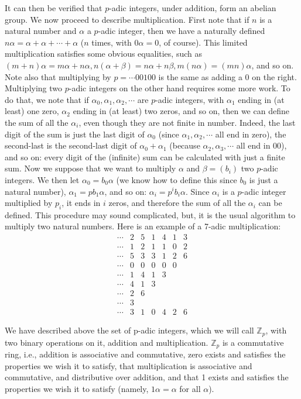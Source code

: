 \documentclass{llncs}
\begin{document}
It can then be verified that $p$-adic integers, under addition, form an abelian
group.
We now proceed to describe multiplication. First note that if $n$ is a natural
number and $\alpha $ a $p$-adic integer, then we have a naturally defined $n\alpha  = \alpha +\alpha + \cdots +\alpha $
($n$ times, with $0\alpha  = 0$, of course).  This limited multiplication satisfies some obvious equalities, such as
$(m + n)\alpha = m\alpha  + n\alpha , n(\alpha  + \beta) = n\alpha  + n\beta , m(n\alpha ) = (mn)\alpha $, and so on. 
Note also that multiplying by $p = \cdots 00100$ is the same as adding a $0$
on the right.
Multiplying two $p$-adic integers on the other hand requires some more work.
To do that, we note that if $\alpha _0, \alpha _1, \alpha _2, \cdots $  are $p$-adic integers, with $\alpha _1$ ending in (at
least) one zero, $\alpha _2$ ending in (at least) two zeros, and so on, then we can define
the sum of all the $\alpha _i$, even though they are not finite in number. Indeed, the last
digit of the sum is just the last digit of $\alpha _0$ (since $\alpha _1, \alpha _2, \cdots $ all end in zero), the
second-last is the second-last digit of $\alpha _0 + \alpha _1$ (because $\alpha _2, \alpha _3, \cdots $ all end in 00),
and so on: every digit of the (infinite) sum can be calculated with just a finite sum.
Now we suppose that we want to multiply $\alpha $ and $\beta  = (b_i)$ two $p$-adic integers. We
then let $\alpha _0 = b_0\alpha $ (we know how to define this since $b_0$ is just a natural number),
$\alpha _1 = pb_1\alpha $, and so on: $\alpha _i = p^ib_i\alpha $. Since $\alpha _i$ is a $p$-adic integer multiplied by $p_i$, it
ends in $i$ zeros, and therefore the sum of all the $\alpha _i$ can be defined.
This procedure may sound complicated, but,  it is the usual algorithm
 to multiply two natural numbers. Here
is an example of a 7-adic multiplication:
$$
\begin{array}{rrrrrrrr|}
\cdots &2&5&1&4&1&3\\
\cdots & 1& 2 &1& 1 & 0& 2\\
\hline
\cdots &5& 3& 3& 1& 2 & 6 \\
\cdots &0&0& 0&0&0& \\
\cdots &1&4&1&3&&\\
\cdots &4&1&3&&&\\
\cdots &2&6&&&&\\
\cdots &3&&&&&\\
\hline
\cdots &3&1&0&4&2&6
\end{array}
$$

We  have described above the set of p-adic integers, which we will call $\mathbb{Z}_p$, with two binary
operations on it, addition and multiplication. $\mathbb{Z}_p$ is a commutative ring, i.e., 
addition is associative and commutative,  zero exists
and satisfies the properties we wish it to satisfy, that multiplication is associative
and commutative, and distributive over addition, and that 1 exists and satisfies the
properties we wish it to satisfy (namely, $1\alpha  = \alpha $   for all    $\alpha $).
\end{document}
